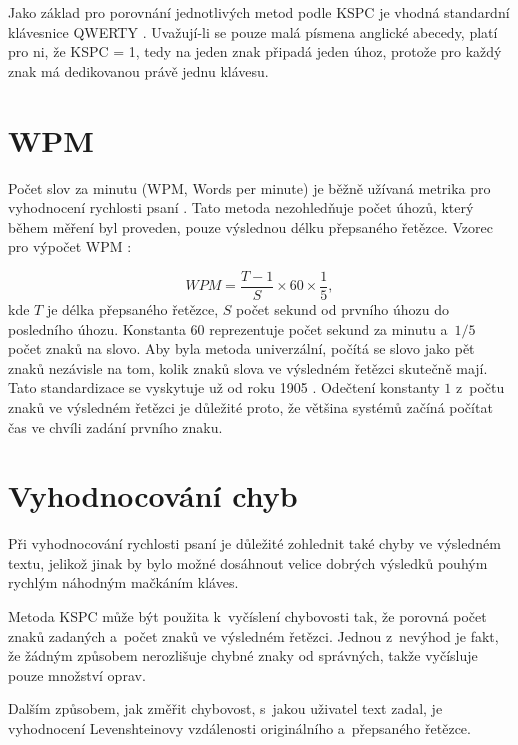 \documentclass[a4paper,11pt,openany]{book} %
\begin{document}
Jako základ pro porovnání jednotlivých metod podle KSPC je vhodná standardní klávesnice QWERTY \parencite{arif2009analysis}. %
Uvažují-li se pouze malá písmena anglické abecedy, platí pro ni, že KSPC = 1, tedy na jeden znak připadá jeden úhoz, protože pro každý znak má dedikovanou právě jednu klávesu.

\section{WPM}

Počet slov za minutu (WPM, Words per minute) je běžně užívaná metrika pro vyhodnocení rychlosti psaní \parencite{tarvainen2010beginner}. %
Tato metoda nezohledňuje počet úhozů, který během měření byl proveden, pouze výslednou délku přepsaného řetězce. Vzorec pro výpočet WPM \parencite[48]{wobbrockjacobo.2007}:

\[
	WPM = \frac{T - 1}{S} \times 60 \times \frac{1}{5},
\]
kde $T$ je délka přepsaného řetězce, $S$ počet sekund od prvního úhozu do posledního úhozu. Konstanta $60$ reprezentuje počet sekund za minutu a~$1/5$ počet znaků na slovo. Aby byla metoda univerzální, počítá se slovo jako pět znaků nezávisle na tom, kolik znaků slova ve výsledném řetězci skutečně mají. Tato standardizace se vyskytuje už od roku 1905 \parencite{yamada1980historical}. Odečtení konstanty $1$ z~počtu znaků ve výsledném řetězci je důležité proto, že většina systémů začíná počítat čas ve chvíli zadání prvního znaku. \parencite[49]{wobbrockjacobo.2007}

\section{Vyhodnocování chyb}

Při vyhodnocování rychlosti psaní je důležité zohlednit také chyby ve výsledném textu, jelikož jinak by bylo možné dosáhnout velice dobrých výsledků pouhým rychlým náhodným mačkáním kláves.

Metoda KSPC může být použita k~vyčíslení chybovosti tak, že porovná počet znaků zadaných a~počet znaků ve výsledném řetězci. Jednou z~nevýhod je fakt, že žádným způsobem nerozlišuje chybné znaky od správných, takže vyčísluje pouze množství oprav. %

Dalším způsobem, jak změřit chybovost, s~jakou uživatel text zadal, je vyhodnocení Levenshteinovy vzdálenosti originálního a~přepsaného řetězce. \parencite{soukoreff2001measuring} %
\end{document}
